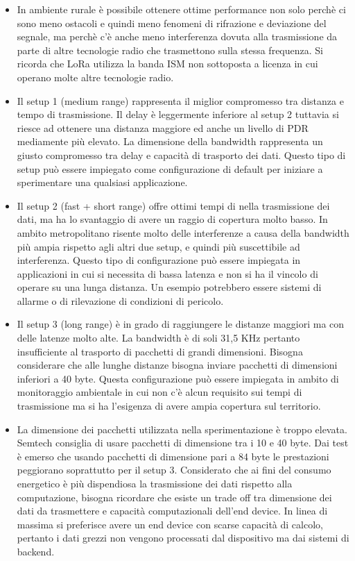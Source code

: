 \documentclass[12pt,a4paper,openright,twoside]{report}
\begin{document}
\begin{itemize}                       
\item In ambiente rurale \`e possibile ottenere ottime performance non solo perch\`e ci sono meno ostacoli e quindi meno fenomeni di rifrazione e deviazione del segnale, ma perch\`e c'\`e anche meno interferenza dovuta alla trasmissione da parte di altre tecnologie radio che trasmettono sulla stessa frequenza. Si ricorda che LoRa utilizza la banda ISM non sottoposta a licenza in cui operano molte altre tecnologie radio.
\item Il setup 1 (medium range) rappresenta il miglior compromesso tra distanza e tempo di trasmissione. Il delay \`e leggermente inferiore al setup 2 tuttavia si riesce ad ottenere una distanza maggiore ed anche un livello di PDR mediamente pi\`u elevato.
La dimensione della bandwidth rappresenta un giusto compromesso tra delay e capacit\`a di trasporto dei dati. Questo tipo di setup pu\`o essere impiegato come configurazione di default per iniziare a sperimentare una qualsiasi applicazione.
\item Il setup 2 (fast + short range) offre ottimi tempi di nella trasmissione dei dati, ma ha lo svantaggio di avere un raggio di copertura molto basso. In ambito metropolitano risente molto delle interferenze a causa della bandwidth pi\`u ampia rispetto agli altri due setup, e quindi pi\`u suscettibile ad interferenza. Questo tipo di configurazione pu\`o essere impiegata in applicazioni in cui si necessita di bassa latenza e non si ha il vincolo di operare su una lunga distanza. Un esempio potrebbero essere sistemi di allarme o di rilevazione di condizioni di pericolo. 
\item Il setup 3 (long range) \`e in grado di raggiungere le distanze maggiori ma con delle latenze molto alte. La bandwidth \`e di soli 31,5 KHz pertanto insufficiente al trasporto di pacchetti di grandi dimensioni. Bisogna considerare che alle lunghe distanze bisogna inviare pacchetti di dimensioni inferiori a 40 byte. 
Questa configurazione pu\`o essere impiegata in ambito di monitoraggio ambientale in cui non c'\`e alcun requisito sui tempi di trasmissione ma si ha l'esigenza di avere ampia copertura sul territorio.
\item La dimensione dei pacchetti utilizzata nella sperimentazione \`e troppo elevata. Semtech consiglia di usare pacchetti di dimensione tra i 10 e 40 byte. Dai test \`e emerso che usando pacchetti di dimensione pari a 84 byte le prestazioni peggiorano soprattutto per il setup 3. Considerato che ai fini del consumo energetico \`e pi\`u dispendiosa la trasmissione dei dati rispetto alla computazione, bisogna ricordare che esiste un trade off tra dimensione dei dati da trasmettere e capacit\`a computazionali dell'end device. In linea di massima si preferisce avere un end device con scarse capacit\`a di calcolo, pertanto i dati grezzi non vengono processati dal dispositivo ma dai sistemi di backend. 

\end{itemize}
\end{document}
